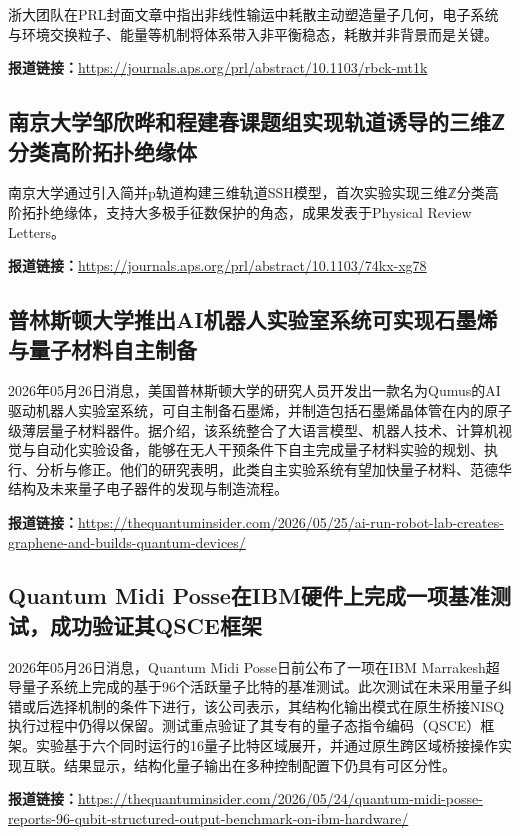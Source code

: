\documentclass[12pt,a4paper]{ctexart}
\begin{document}
浙大团队在PRL封面文章中指出非线性输运中耗散主动塑造量子几何，电子系统与环境交换粒子、能量等机制将体系带入非平衡稳态，耗散并非背景而是关键。

\noindent\textbf{报道链接：}\url{https://journals.aps.org/prl/abstract/10.1103/rbck-mt1k}

\subsection{ 南京大学邹欣晔和程建春课题组实现轨道诱导的三维ℤ分类高阶拓扑绝缘体 }

南京大学通过引入简并p轨道构建三维轨道SSH模型，首次实验实现三维ℤ分类高阶拓扑绝缘体，支持大多极手征数保护的角态，成果发表于Physical Review Letters。

\noindent\textbf{报道链接：}\url{https://journals.aps.org/prl/abstract/10.1103/74kx-xg78}

\subsection{ 普林斯顿大学推出AI机器人实验室系统可实现石墨烯与量子材料自主制备 }

2026年05月26日消息，美国普林斯顿大学的研究人员开发出一款名为Qumus的AI驱动机器人实验室系统，可自主制备石墨烯，并制造包括石墨烯晶体管在内的原子级薄层量子材料器件。据介绍，该系统整合了大语言模型、机器人技术、计算机视觉与自动化实验设备，能够在无人干预条件下自主完成量子材料实验的规划、执行、分析与修正。他们的研究表明，此类自主实验系统有望加快量子材料、范德华结构及未来量子电子器件的发现与制造流程。

\noindent\textbf{报道链接：}\url{https://thequantuminsider.com/2026/05/25/ai-run-robot-lab-creates-graphene-and-builds-quantum-devices/}

\subsection{ Quantum Midi Posse在IBM硬件上完成一项基准测试，成功验证其QSCE框架 }

2026年05月26日消息，Quantum Midi Posse日前公布了一项在IBM Marrakesh超导量子系统上完成的基于96个活跃量子比特的基准测试。此次测试在未采用量子纠错或后选择机制的条件下进行，该公司表示，其结构化输出模式在原生桥接NISQ执行过程中仍得以保留。测试重点验证了其专有的量子态指令编码（QSCE）框架。实验基于六个同时运行的16量子比特区域展开，并通过原生跨区域桥接操作实现互联。结果显示，结构化量子输出在多种控制配置下仍具有可区分性。

\noindent\textbf{报道链接：}\url{https://thequantuminsider.com/2026/05/24/quantum-midi-posse-reports-96-qubit-structured-output-benchmark-on-ibm-hardware/}
\end{document}
